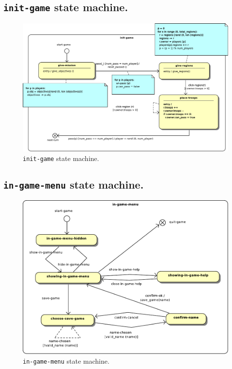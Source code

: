 \documentclass[12pt,a4paper]{article}
\begin{document}
\subsection{\texttt{init-game} state machine.}
\begin{figure}[H]
  \centering
  \includegraphics[width=15cm]{pic/3.pdf}
  \caption{\texttt{init-game} state machine.}
  \label{fig:sm:init-game}
\end{figure}

\subsection{\texttt{in-game-menu} state machine.}
\begin{figure}[H]
  \centering
  \includegraphics[width=14cm]{pic/4.pdf}
  \caption{\texttt{in-game-menu} state machine.}
  \label{fig:sm:in-game-menu}
\end{figure}
\end{document}
